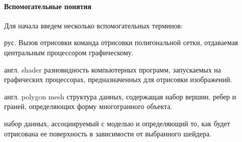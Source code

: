 ﻿\paragraph{Вспомогательные понятия}

\begin{rglossary}
    Для начала введем несколько вспомогательных терминов:

    {рус. Вызов отрисовки}
    {команда отрисовки полигональной сетки,
    отдаваемая центральным процессором графическому.}

    {англ. shader}
    {разновидность компьютерных программ, запускаемых на графических процессорах,
    предназначенных для отрисовки изображений.}

    {англ. polygon mesh}
    {структура данных, содержащая набор вершин, ребер и граней,
    определяющих форму многогранного объекта.}

    {набор данных, ассоциируемый с моделью и
    определяющий то, как будет отрисована ее поверхность
    в зависимости от выбранного шейдера.}
\end{rglossary}

